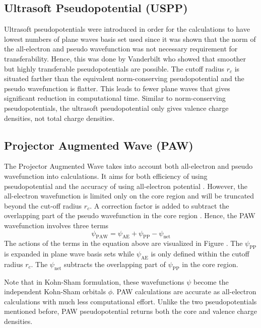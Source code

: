 \subsection{Ultrasoft Pseudopotential (USPP)}
Ultrasoft pseudopotentials were introduced in order for the calculations to have lowest numbers of plane waves basis set used since it was shown that the norm of the all-electron and pseudo wavefunction was not necessary requirement for transferability. Hence, this was done by Vanderbilt \citep{Vanderbilt1990} who showed that smoother but highly transferable pseudopotentials are possible. The cutoff radius $r_c$ is situated farther than the equivalent norm-conserving pseudopotential and the pseudo wavefunction is flatter. This leads to fewer plane waves that gives significant reduction in computational time. Similar to norm-conserving pseudopotentials, the ultrasoft pseudopotential only gives valence charge densities, not total charge
densities.

\subsection{Projector Augmented Wave (PAW)}
The Projector Augmented Wave takes into account both all-electron and pseudo wavefunction into calculations. It aims
for both efficiency of using pseudopotential and the accuracy of using all-electron potential \citep{Bloechl1994,Kresse1999}. However, the all-electron wavefunction is limited only on the core region and will be truncated beyond the cut-off radius $r_c$. A correction factor is added to subtract the overlapping part of the pseudo wavefunction in the core region \citep{Rostgaard2009}. Hence, the PAW wavefunction involves three terms
\begin{equation}
	\psi_{\text{PAW}} =  \psi_{\text{AE}} + \psi_{\text{PP}}  - \psi_{\text{net}}
\end{equation}
The actions of the terms in the equation above are visualized in Figure . The $\psi_{\text{PP}}$ is expanded in plane wave basis sets while $\psi_{\text{AE}}$ is only defined within the cutoff radius $r_c$. The $\psi_{\text{net}}$ subtracts the overlapping part of $\psi_{\text{PP}}$ in the core region.

Note that in Kohn-Sham formulation, these wavefunctions $\psi$ become the independent Kohn-Sham orbitals $\phi$. PAW calculations are accurate as all-electron calculations with much less computational effort. Unlike the two pseudopotentials mentioned before, PAW pseudopotential returns both the core and valence charge densities.

